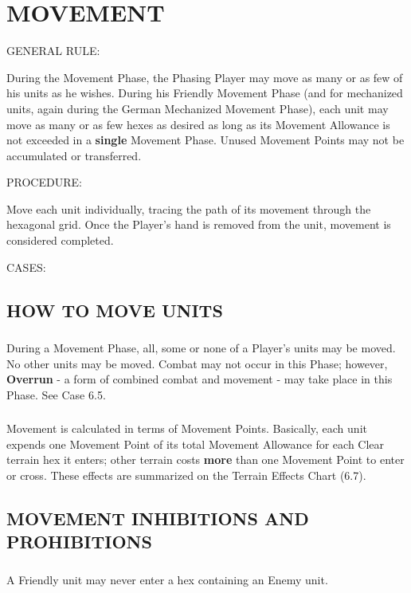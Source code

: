 \section{MOVEMENT}

GENERAL RULE:

During the Movement Phase, the Phasing Player may move as many or as few of his units as he wishes. During his Friendly Movement Phase (and for mechanized units, again during the German Mechanized Movement Phase), each unit may move as many or as few hexes as desired as long as its Movement Allowance is not exceeded in a \textbf{single} Movement Phase. Unused Movement Points may not be accumulated or transferred.

PROCEDURE:

Move each unit individually, tracing the path of its movement through the hexagonal grid. Once the Player's hand is removed from the unit, movement is considered completed.

CASES:

\subsection{HOW TO MOVE UNITS}

\subsubsection{} During a Movement Phase, all, some or none of a Player's units may be moved. No other units may be moved. Combat may not occur in this Phase; however, \textbf{Overrun} - a form of combined combat and movement - may take place in this Phase. See Case 6.5.

\subsubsection{} Movement is calculated in terms of Movement Points. Basically, each unit expends one Movement Point of its total Movement Allowance for each Clear terrain hex it enters; other terrain costs \textbf{more} than one Movement Point to enter or cross. These effects are summarized on the Terrain Effects Chart (6.7).

\subsection{MOVEMENT INHIBITIONS AND PROHIBITIONS}

\subsubsection{} A Friendly unit may never enter a hex containing an Enemy unit.

